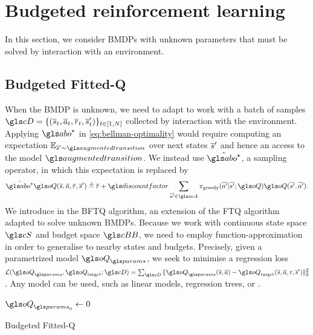 \section{Budgeted reinforcement learning}

\label{sec:brl}

In this section, we consider \glspl{BMDP} with unknown parameters that must be solved by interaction with an environment. 

\subsection{Budgeted Fitted-Q}
\label{subsec:bftq}

When the \gls{BMDP} is unknown, we need to adapt  to work with a batch of samples $\cD=\{(\os_t,\oa_t,\overline{r}_t,\os_t')\}_{t\in [1,N]}$ collected by interaction with the environment. Applying $\abo^{\star}$ in \eqref{eq:bellman-optimality} would require computing an expectation $\expectedvalue_{\os'\sim \augmentedtransition}$ over next states $\overline{s}'$ and hence an access to the model $\augmentedtransition$. We instead use $\hat{\abo^{\star}}$, a sampling operator, in which this expectation is replaced by
\begin{equation*}
\hat{\abo^{\star}} \oQ(\os, \oa, \overline{r}, \os') \eqdef \overline{r} + \discount \sum_{\ov{a'}\in \ocA} \pi_\text{greedy}(\ov{a'}|\ov{s'}; \oQ) \oQ(\ov{s'}, \ov{a'}).
\end{equation*}
We introduce in  the \gls{BFTQ} algorithm, an extension of the \gls{FTQ} algorithm adapted to solve unknown \glspl{BMDP}. Because we work with continuous state space $\cS$ and budget space $\budgetspace$, we need to employ function-approximation in order to generalise to nearby states and budgets. Precisely, given a parametrized model $\oQ_\params$, we seek to minimise a regression loss $\cL(\oQ_\params, \oQ_\text{target};\cD) = \sum_{\cD} \|\oQ_\params(\os, \oa) - \oQ_\text{target}(\os, \oa, r, \os')\|_2^2$.
Any model can be used, such as linear models, regression trees, or .

\begin{algorithm}[ht]
	\DontPrintSemicolon
	\KwData{$\cD$}
	$\oQ_{\params_0} \leftarrow 0$\;
	\caption{Budgeted Fitted-Q}
	\label{alg:bftq}
\end{algorithm}

